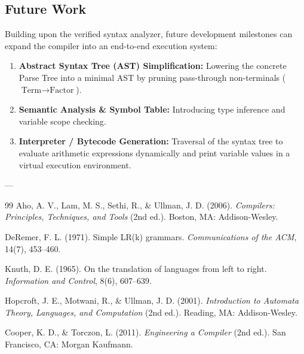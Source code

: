 \documentclass[11pt,a4paper]{article}
\begin{document}
\subsection{Future Work}
Building upon the verified syntax analyzer, future development milestones can expand the compiler into an end-to-end execution system:
\begin{enumerate}
    \item \textbf{Abstract Syntax Tree (AST) Simplification:} Lowering the concrete Parse Tree into a minimal AST by pruning pass-through non-terminals ($\text{Term} \to \text{Factor}$).
    \item \textbf{Semantic Analysis \& Symbol Table:} Introducing type inference and variable scope checking.
    \item \textbf{Interpreter / Bytecode Generation:} Traversal of the syntax tree to evaluate arithmetic expressions dynamically and print variable values in a virtual execution environment.
\end{enumerate}

---

\begin{thebibliography}{99}
Aho, A. V., Lam, M. S., Sethi, R., \& Ullman, J. D. (2006). \textit{Compilers: Principles, Techniques, and Tools} (2nd ed.). Boston, MA: Addison-Wesley.

DeRemer, F. L. (1971). Simple LR(k) grammars. \textit{Communications of the ACM}, 14(7), 453--460.

Knuth, D. E. (1965). On the translation of languages from left to right. \textit{Information and Control}, 8(6), 607--639.

Hopcroft, J. E., Motwani, R., \& Ullman, J. D. (2001). \textit{Introduction to Automata Theory, Languages, and Computation} (2nd ed.). Reading, MA: Addison-Wesley.

Cooper, K. D., \& Torczon, L. (2011). \textit{Engineering a Compiler} (2nd ed.). San Francisco, CA: Morgan Kaufmann.
\end{thebibliography}
\end{document}
